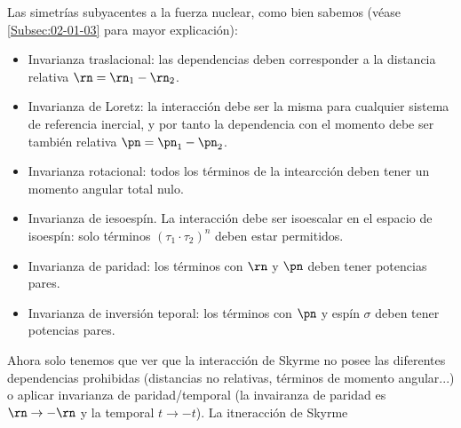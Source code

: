     Las simetrías subyacentes a la fuerza nuclear, como bien sabemos (véase \cref{Subsec:02-01-03} para mayor explicación):

    \begin{itemize}
        \item Invarianza traslacional: las dependencias deben corresponder a la distancia relativa $\rn=\rn_1-\rn_2$.
        \item Invarianza de Loretz: la interacción debe ser la misma para cualquier sistema de referencia inercial, y por tanto la dependencia con el momento debe ser también relativa $\pn=\pn_1-\pn_2$.
        \item Invarianza rotacional: todos los términos de la intearcción deben tener un momento angular total nulo.
        \item Invarianza de iesoespín. La interacción debe ser isoescalar en el espacio de isoespín: solo términos $(\tau_1\cdot\tau_2)^n$ deben estar permitidos.
        \item Invarianza de paridad: los términos con $\rn$ y $\pn$ deben tener potencias pares.
        \item Invarianza de inversión teporal: los términos con $\pn$ y espín $\sigma$ deben tener potencias pares.
    \end{itemize}
    Ahora solo tenemos que ver que la interacción de Skyrme no posee las diferentes dependencias prohibidas (distancias no relativas, términos de momento angular...) o aplicar invarianza de paridad/temporal (la invairanza de paridad es $\rn\rightarrow -\rn$ y la temporal $t\rightarrow -t$). La itneracción de Skyrme

